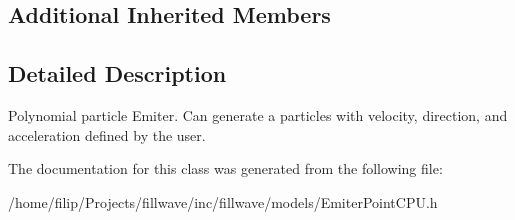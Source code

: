 \subsection*{Additional Inherited Members}


\subsection{Detailed Description}
Polynomial particle Emiter. Can generate a particles with velocity, direction, and acceleration defined by the user. 

The documentation for this class was generated from the following file\+:\begin{DoxyCompactItemize}
\item 
/home/filip/\+Projects/fillwave/inc/fillwave/models/Emiter\+Point\+C\+P\+U.\+h\end{DoxyCompactItemize}
